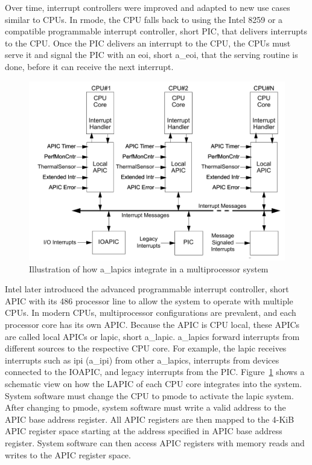 Over time, interrupt controllers were improved and adapted to new use cases
similar to CPUs. In \gls{rmode}, the CPU falls back to using the Intel 8259 or a
compatible programmable interrupt controller, short PIC, that delivers
interrupts to the CPU. Once the PIC delivers an interrupt to the CPU, the CPUs
must serve it and signal the PIC with an \gls{eoi}, short \acrshort{a_eoi}, that
the serving routine is done, before it can receive the next interrupt. \\

\begin{figure}
    \begin{center}
        \includegraphics[width=.6\textwidth]{images/lapic_placeholder.png}
        \caption{Illustration of how \acrshort{a_lapic}s integrate in a multiprocessor system}
        \label{fig:state:technical:lapic}
    \end{center}
\end{figure}

Intel later introduced the advanced programmable interrupt controller, short
APIC with its 486 processor line to allow the system to operate with multiple
CPUs. In modern CPUs, multiprocessor configurations are prevalent, and each processor
core has its own APIC. Because the APIC is CPU local, these APICs are called
local APICs or \gls{lapic}, short \acrshort{a_lapic}. \acrshort{a_lapic}s forward
interrupts from different sources to the respective CPU core. For example, the
\gls{lapic} receives interrupts such as \gls{ipi} (\acrshort{a_ipi}) from other
\acrshort{a_lapic}s, interrupts from devices connected to the IOAPIC, and legacy
interrupts from the PIC. Figure~\ref{fig:state:technical:lapic} shows a
schematic view on how the LAPIC of each CPU core integrates into the system.
System software must change the CPU to \gls{pmode} to
activate the \acrshort{lapic} system. After changing to \gls{pmode}, system
software must write a valid address to the APIC base address register. All APIC
registers are then mapped to the 4-KiB APIC register space starting at the
address specified in APIC base address register. System software can then access
APIC registers with memory reads and writes to the APIC register space.

